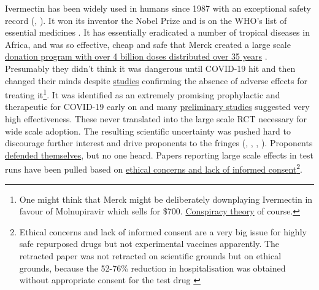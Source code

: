 \documentclass[11pt,a4paper,notitlepage]{report}
\begin{document}
Ivermectin has been widely used in humans since 1987 with an exceptional safety record (\cite{Smit2016-fq}, \cite{Crump2011-ev}). It won its inventor the Nobel Prize and is on the WHO’s list of essential medicines \cite{Crump2017-qg}. It has essentially eradicated a number of tropical diseases in Africa, and was so effective, cheap and safe that Merck created a large scale \href{https://www.merck.com/stories/mectizan/}{donation program with over 4 billion doses distributed over 35 years} \cite{merck06012021}. Presumably they didn't think it was dangerous until COVID-19 hit and then changed their minds despite \href{https://academic.oup.com/ofid/article/8/Supplement_1/S365/6450290}{studies} \cite{wentzel2021} confirming the absence of adverse effects for treating it\footnote{One might think that Merck might be deliberately downplaying Ivermectin in favour of Molnupiravir which sells  for \$700. \href{https://www.bloomberg.com/news/articles/2021-12-08/merck-s-mrk-covid-pill-must-first-overcome-anti-vax-ivermectin-misinformation}{Conspiracy theory} of course.}. It was identified as an extremely promising prophylactic and therapeutic for COVID-19 early on and many \href{https://c19ivermectin.com/}{preliminary studies} suggested very high effectiveness. These never translated into the large scale RCT necessary for wide scale adoption. The resulting scientific uncertainty was pushed hard to discourage further interest and drive proponents to the fringes (\cite{bbc06102021}, \cite{guardian13092021}, \cite{guardian24092021}, \cite{guardian24092021b}). Proponents \href{https://bird-group.org/the-bbcs-recent-article-false-science-is-disintegrating-under-scrutiny/}{defended themselves}, but no one heard. Papers reporting large scale effects in test runs have been pulled based on \href{https://healthpolicy-watch.news/mexico-city-officials-in-row-over-misleading-paper-to-justify-its-ivermectin-drive/}{ethical concerns and lack of informed consent}\footnote{Ethical concerns and lack of informed consent are a very big issue for highly safe repurposed drugs but not experimental vaccines apparently. The retracted paper was not retracted on scientific grounds but on ethical grounds, because the 52-76\% reduction in hospitalisation was obtained without appropriate consent for the test drug \cite{bmj22022022}}. 
\end{document}
